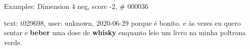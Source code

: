 \begin{frame}{Examples: Dimension 4 neg, score -2, \# 000036}
\footnotesize
\begin{alertblock}{text: t029698, user: unknown, 2020-06-29}
porque é bonito. e às vezes eu quero sentar e \textbf{beber} uma dose de 
\textbf{whisky} enquanto leio um livro na minha poltrona verde. 
\end{alertblock}
\end{frame}
